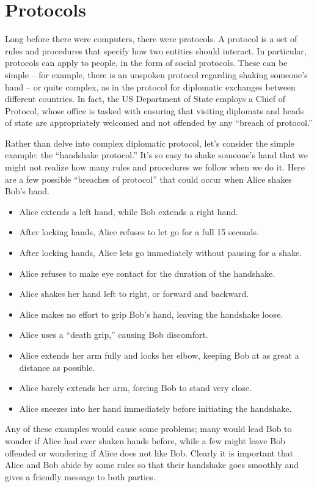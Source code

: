 \section{Protocols}

Long before there were computers, there were protocols. A protocol is a set of rules and procedures that specify how two entities should interact. In particular, protocols can apply to people, in the form of social protocols. These can be simple -- for example, there is an unspoken protocol regarding shaking someone's hand -- or quite complex, as in the protocol for diplomatic exchanges between different countries. In fact, the US Department of State employs a Chief of Protocol, whose office is tasked with ensuring that visiting diplomats and heads of state are appropriately welcomed and not offended by any ``breach of protocol.''

Rather than delve into complex diplomatic protocol, let's consider the simple example: the ``handshake protocol.'' It's so easy to shake someone's hand that we might not realize how many rules and procedures we follow when we do it. Here are a few possible ``breaches of protocol'' that could occur when Alice shakes Bob's hand.
\begin{itemize}
    \item Alice extends a left hand, while Bob extends a right hand.
    \item After locking hands, Alice refuses to let go for a full 15 seconds.
    \item After locking hands, Alice lets go immediately without pausing for a shake.
    \item Alice refuses to make eye contact for the duration of the handshake.
    \item Alice shakes her hand left to right, or forward and backward.
    \item Alice makes no effort to grip Bob's hand, leaving the handshake loose.
    \item Alice uses a ``death grip,'' causing Bob discomfort.
    \item Alice extends her arm fully and locks her elbow, keeping Bob at as great a distance as possible.
    \item Alice barely extends her arm, forcing Bob to stand very close.
    \item Alice sneezes into her hand immediately before initiating the handshake.
\end{itemize}
Any of these examples would cause some problems; many would lead Bob to wonder if Alice had ever shaken hands before, while a few might leave Bob offended or wondering if Alice does not like Bob. Clearly it is important that Alice and Bob abide by some rules so that their handshake goes smoothly and gives a friendly message to both parties.

